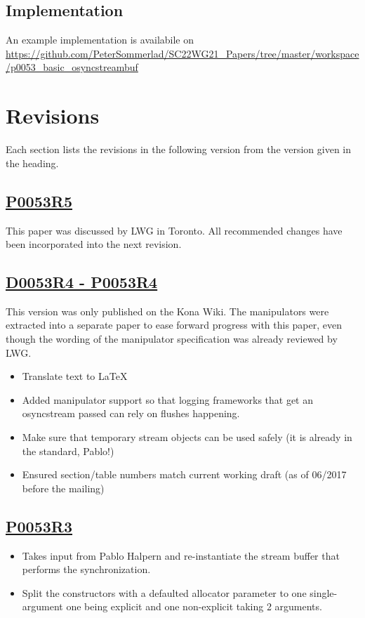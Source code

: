 \documentclass[ebook,11pt,article]{memoir}
\begin{document}
\section{Implementation}
An example implementation is availabile on \url{https://github.com/PeterSommerlad/SC22WG21_Papers/tree/master/workspace/p0053_basic_osyncstreambuf}

\chapter{Revisions}
Each section lists the revisions in the following version from the version given in the heading.

\section{\href{https://wg21.link/P0053R5}{P0053R5}}
This paper was discussed by LWG in Toronto. All recommended changes have been incorporated into the next revision.
\section{\href{http://wiki.edg.com/pub/Wg21kona2017/LibraryEvolutionWorkingGroup/p0053r4.html}{D0053R4 - P0053R4}}
This version was only published on the Kona Wiki. The manipulators were extracted into a separate paper to ease forward progress with this paper, even though the wording of the manipulator specification was already reviewed by LWG.
\begin{itemize}
\item Translate text to LaTeX
\item Added manipulator support so that logging frameworks that get an osyncstream passed can rely on flushes happening.
\item Make sure that temporary stream objects can be used safely (it is already in the standard, Pablo!)
\item Ensured section/table numbers match current working draft (as of 06/2017 before the mailing)
\end{itemize}

\section{\href{https://wg21.link/P0053R3}{P0053R3}}
\begin{itemize}
\item Takes input from Pablo Halpern and re-instantiate the stream buffer that performs the synchronization.
\item Split the constructors with a defaulted allocator parameter to one single-argument one being explicit and one non-explicit taking 2 arguments.
\end{itemize}
\end{document}
